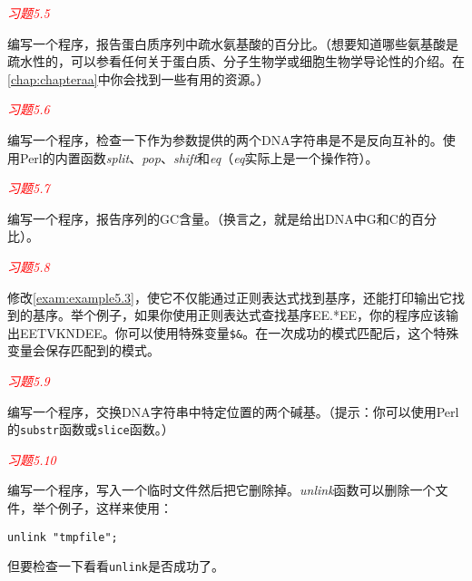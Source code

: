 \textcolor{red}{\textit{习题5.5}}
\begin{adjustwidth}{4em}{}
编写一个程序，报告蛋白质序列中疏水氨基酸的百分比。（想要知道哪些氨基酸是疏水性的，可以参看任何关于蛋白质、分子生物学或细胞生物学导论性的介绍。在\autoref{chap:chapteraa}中你会找到一些有用的资源。）
\end{adjustwidth}

\textcolor{red}{\textit{习题5.6}}
\begin{adjustwidth}{4em}{}
编写一个程序，检查一下作为参数提供的两个DNA字符串是不是反向互补的。使用Perl的内置函数\textit{split}、\textit{pop}、\textit{shift}和\textit{eq}（\textit{eq}实际上是一个操作符）。
\end{adjustwidth}

\textcolor{red}{\textit{习题5.7}}
\begin{adjustwidth}{4em}{}
编写一个程序，报告序列的GC含量。（换言之，就是给出DNA中G和C的百分比）。
\end{adjustwidth}

\textcolor{red}{\textit{习题5.8}}
\begin{adjustwidth}{4em}{}
修改\autoref{exam:example5.3}，使它不仅能通过正则表达式找到基序，还能打印输出它找到的基序。举个例子，如果你使用正则表达式查找基序EE.*EE，你的程序应该输出EETVKNDEE。你可以使用特殊变量\verb|$&|。在一次成功的模式匹配后，这个特殊变量会保存匹配到的模式。
\end{adjustwidth}

\textcolor{red}{\textit{习题5.9}}
\begin{adjustwidth}{4em}{}
编写一个程序，交换DNA字符串中特定位置的两个碱基。（提示：你可以使用Perl的\verb|substr|函数或\verb|slice|函数。）
\end{adjustwidth}

\textcolor{red}{\textit{习题5.10}}
\begin{adjustwidth}{4em}{}
编写一个程序，写入一个临时文件然后把它删除掉。\textit{unlink}函数可以删除一个文件，举个例子，这样来使用：
\begin{lstlisting}
unlink "tmpfile";
\end{lstlisting}
但要检查一下看看\verb|unlink|是否成功了。
\end{adjustwidth}
